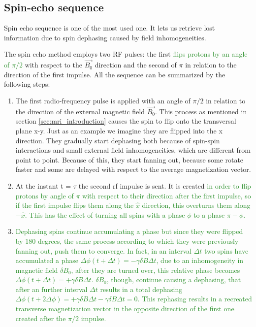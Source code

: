 \documentclass[11pt]{report}
\begin{document}
\subsection{Spin-echo sequence}

Spin echo sequence is one of the most used one.
It lets us retrieve lost information due to spin dephasing caused by field inhomogeneities.

The spin echo method employs two RF pulses: the first \textcolor{ForestGreen}{flips protons by an angle of $\pi/2$} with respect to the $\vec{B_0}$ direction and the second of $\pi$ in relation to the direction of the first impulse.
All the sequence can be summarized by the following steps:
\begin{enumerate}
\item The first radio-frequency pulse is applied with an angle of $\pi/2$ in relation to the direction of the external magnetic field $\overrightarrow{B_0}$. This process as mentioned in section \ref{sec:mri_introduction} causes the spin to flip onto the transversal plane x-y.
Just as an example we imagine they are flipped into the x direction. They gradually start dephasing both because of spin-spin interactions and small external field inhomogeneities, which are different from point to point.
Because of this, they start fanning out, because some rotate faster and some are delayed with respect to the average magnetization vector.

\item At the instant t = $\tau $ the second rf impulse is sent. It is created \textcolor{ForestGreen}{in order to flip protons by angle of $\pi$ with respect to their direction after the first impulse, so if the first impulse flips them along the $\hat x$ direction, this overturns them along $-\hat x$.
This has the effect of turning all spins with a phase $\phi$ to a phase $\pi - \phi$.}

\item \textcolor{ForestGreen}{Dephasing spins continue accumulating a phase but since they were flipped by 180 degrees, the same process according to which they were previously fanning out, push them to converge.
In fact, in an interval $\Delta t$ two spins have accumulated a phase
$\Delta \phi (t+\Delta t) = -\gamma \delta B \Delta t$,
due to an inhomogeneity in magnetic field $\delta B_0$, after they are turned over, this relative phase becomes
$\Delta \phi (t+\Delta t)= + \gamma \delta B \Delta t$. $\delta B_0$,
though, continue causing a dephasing, that after an further interval $\Delta t$ results in a total dephasing
$\Delta \phi (t+2 \Delta \phi) = + \gamma \delta B \Delta t - \gamma \delta B \Delta t = 0$.
This rephasing results in a recreated transverse magnetization vector in the opposite direction of the first one created after the $\pi/2$ impulse.
}
\end{enumerate}
\end{document}
